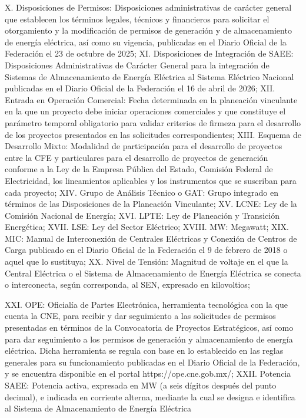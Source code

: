 X. Disposiciones de Permisos: Disposiciones administrativas de carácter general que establecen los términos legales, técnicos y financieros para solicitar el otorgamiento y la modificación de permisos de generación y de almacenamiento de energía eléctrica, así como su vigencia, publicadas en el Diario Oficial de la Federación el 23 de octubre de 2025;
XI. Disposiciones de Integración de SAEE: Disposiciones Administrativas de Carácter General para la integración de Sistemas de Almacenamiento de Energía Eléctrica al Sistema Eléctrico Nacional publicadas en el Diario Oficial de la Federación el 16 de abril de 2026;
XII. Entrada en Operación Comercial: Fecha determinada en la planeación vinculante en la que un proyecto debe iniciar operaciones comerciales y que constituye el parámetro temporal obligatorio para validar criterios de firmeza para el desarrollo de los proyectos presentados en las solicitudes correspondientes;
XIII. Esquema de Desarrollo Mixto: Modalidad de participación para el desarrollo de proyectos entre la CFE y particulares para el desarrollo de proyectos de generación conforme a la Ley de la Empresa Pública del Estado, Comisión Federal de Electricidad, los lineamientos aplicables y los instrumentos que se suscriban para cada proyecto;
XIV. Grupo de Análisis Técnico o GAT: Grupo integrado en términos de las Disposiciones de la Planeación Vinculante;
XV. LCNE: Ley de la Comisión Nacional de Energía;
XVI. LPTE: Ley de Planeación y Transición Energética;
XVII. LSE: Ley del Sector Eléctrico;
XVIII. MW: Megawatt;
XIX. MIC: Manual de Interconexión de Centrales Eléctricas y Conexión de Centros de Carga publicado en el Diario Oficial de la Federación el 9 de febrero de 2018 o aquel que lo sustituya;
XX. Nivel de Tensión: Magnitud de voltaje en el que la Central Eléctrica o el Sistema de Almacenamiento de Energía Eléctrica se conecta o interconecta, según corresponda, al SEN, expresado en kilovoltios;\par
XXI. OPE: Oficialía de Partes Electrónica, herramienta tecnológica con la que cuenta la CNE, para recibir y dar seguimiento a las solicitudes de permisos presentadas en términos de la Convocatoria de Proyectos Estratégicos, así como para dar seguimiento a los permisos de generación y almacenamiento de energía eléctrica. Dicha herramienta se regula con base en lo establecido en las reglas generales para su funcionamiento publicadas en el Diario Oficial de la Federación, y se encuentra disponible en el portal https://ope.cne.gob.mx/;
XXII. Potencia SAEE: Potencia activa, expresada en MW (a seis dígitos después del punto decimal), e indicada en corriente alterna, mediante la cual se designa e identifica al Sistema de Almacenamiento de Energía Eléctrica

